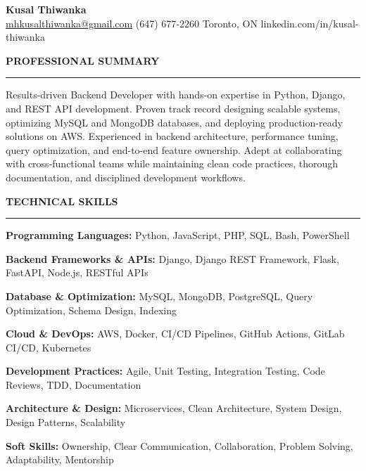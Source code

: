 \documentclass[10pt,letterpaper]{article}
\begin{document}
\begin{center}
{\LARGE\textbf{Kusal Thiwanka}}\\[3pt]
\href{mailto:mhkusalthiwanka@gmail.com}{mhkusalthiwanka@gmail.com}\hspace{2em}%
(647) 677{-}2260\hspace{2em}%
Toronto, ON\hspace{2em}
linkedin.com/in/kusal-thiwanka
\end{center}

\vspace{6pt}

\textbf{PROFESSIONAL SUMMARY}\\[-8pt]
\noindent\rule{\textwidth}{1pt}

\vspace{-2pt}

Results-driven Backend Developer with hands-on expertise in Python, Django, and REST API development. Proven track record designing scalable systems, optimizing MySQL and MongoDB databases, and deploying production-ready solutions on AWS. Experienced in backend architecture, performance tuning, query optimization, and end-to-end feature ownership. Adept at collaborating with cross-functional teams while maintaining clean code practices, thorough documentation, and disciplined development workflows.

\vspace{8pt}

\textbf{TECHNICAL SKILLS}\\[-8pt]
\noindent\rule{\textwidth}{1pt}

\vspace{-2pt}

\textbf{Programming Languages:} Python, JavaScript, PHP, SQL, Bash, PowerShell

\textbf{Backend Frameworks \& APIs:} Django, Django REST Framework, Flask, FastAPI, Node.js, RESTful APIs

\textbf{Database \& Optimization:} MySQL, MongoDB, PostgreSQL, Query Optimization, Schema Design, Indexing

\textbf{Cloud \& DevOps:} AWS, Docker, CI/CD Pipelines, GitHub Actions, GitLab CI/CD, Kubernetes

\textbf{Development Practices:} Agile, Unit Testing, Integration Testing, Code Reviews, TDD, Documentation

\textbf{Architecture \& Design:} Microservices, Clean Architecture, System Design, Design Patterns, Scalability

\textbf{Soft Skills:} Ownership, Clear Communication, Collaboration, Problem Solving, Adaptability, Mentorship
\end{document}
